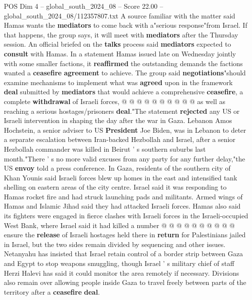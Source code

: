 \begin{textsample}{POS Dim 4 – global\_south\_2024\_08 – Score 22.00 – global\_south\_2024\_08/112357807.txt}
A source familiar with the matter said Hamas wants the \textbf{mediators} to come back with a"serious response"from Israel.
If that happens, the group says, it will meet with \textbf{mediators} after the Thursday session.
An official briefed on the \textbf{talks} process said \textbf{mediators} expected to \textbf{consult} with Hamas.
In a statement Hamas issued late on Wednesday jointly with some smaller factions, it \textbf{reaffirmed} the outstanding demands the factions wanted a \textbf{ceasefire} \textbf{agreement} to achieve.
The group said \textbf{negotiations}"should examine mechanisms to implement what was \textbf{agreed} upon in the framework \textbf{deal} submitted by \textbf{mediators} that would achieve a comprehensive \textbf{ceasefire}, a complete \textbf{withdrawal} of Israeli forces, @ @ @ @ @ @ @ @ @ @ as well as reaching a serious hostages/prisoners \textbf{deal}."The statement \textbf{rejected} any US or Israeli intervention in shaping the day after the war in Gaza.
Lebanon Amos Hochstein, a senior adviser to US \textbf{President} Joe Biden, was in Lebanon to deter a separate escalation between Iran-backed Hezbollah and Israel, after a senior Hezbollah commander was killed in Beirut ' s southern suburbs last month."There ' s no more valid excuses from any party for any further delay,"the US \textbf{envoy} told a press conference.
In Gaza, residents of the southern city of Khan Younis said Israeli forces blew up homes in the east and intensified tank shelling on eastern areas of the city centre.
Israel said it was responding to Hamas rocket fire and had struck launching pads and militants.
Armed wings of Hamas and Islamic Jihad said they had attacked Israeli forces.
Hamas also said its fighters were engaged in fierce clashes with Israeli forces in the Israeli-occupied West Bank, where Israel said it had killed a number @ @ @ @ @ @ @ @ @ @ ensure the \textbf{release} of Israeli hostages held there in \textbf{return} for Palestinians jailed in Israel, but the two sides remain divided by sequencing and other issues.
Netanyahu has insisted that Israel retain control of a border strip between Gaza and Egypt to stop weapons smuggling, though Israel ' s military chief of staff Herzi Halevi has said it could monitor the area remotely if necessary.
Divisions also remain over allowing people inside Gaza to travel freely between parts of the territory after a \textbf{ceasefire} \textbf{deal}.

\end{textsample}
